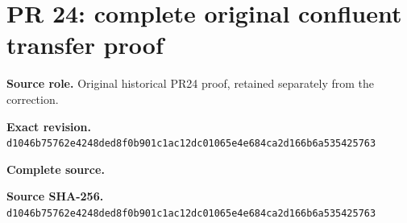 \begingroup
\sloppy
\small
\clearpage
\section{PR 24: complete original confluent transfer proof}
\noindent\textbf{Source role.} Original historical PR24 proof, retained separately from the correction.\par
\noindent\textbf{Exact revision.} \nolinkurl{d1046b75762e4248ded8f0b901c1ac12dc01065e4e684ca2d166b6a535425763}\par
\noindent\textbf{Complete source.} \par
\noindent\textbf{Source SHA-256.} \nolinkurl{d1046b75762e4248ded8f0b901c1ac12dc01065e4e684ca2d166b6a535425763}\par\medskip

\endgroup
